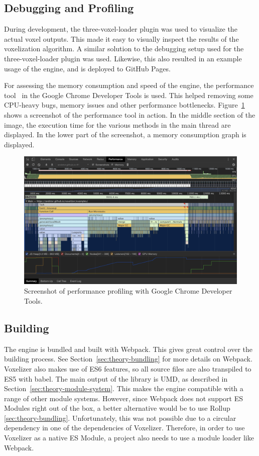 \subsection{Debugging and Profiling}
During development, the three-voxel-loader plugin was used to visualize the actual voxel outputs. This made it easy to visually inspect the results of the voxelization algorithm. A similar solution to the debugging setup used for the three-voxel-loader plugin was used. Likewise, this also resulted in an example usage of the engine, and is deployed to GitHub Pages.

For assessing the memory consumption and speed of the engine, the performance tool~\cite{chrome-dev-tools-profiler} in the Google Chrome Developer Tools is used. This helped removing some CPU-heavy bugs, memory issues and other performance bottlenecks. Figure~\ref{fig:chrome-devtools-performance} shows a screenshot of the performance tool in action. In the middle section of the image, the execution time for the various methods in the main thread are displayed. In the lower part of the screenshot, a memory consumption graph is displayed.
\begin{figure}[ht]
    \centering
    \includegraphics[width=\textwidth]{sections/methodology/figures/chrome-dev-tools-performance.png}
    \caption{Screenshot of performance profiling with Google Chrome Developer Tools.}
    \label{fig:chrome-devtools-performance}
\end{figure}

\subsection{Building}
The engine is bundled and built with Webpack. This gives great control over the building process. See Section~\ref{sec:theory-bundling} for more details on Webpack. Voxelizer also makes use of ES6 features, so all source files are also transpiled to ES5 with babel. The main output of the library is UMD, as described in Section~\ref{sec:theory-module-system}. This makes the engine compatible with a range of other module systems. However, since Webpack does not support ES Modules right out of the box, a better alternative would be to use Rollup \ref{sec:theory-bundling}. Unfortunately, this was not possible due to a circular dependency in one of the dependencies of Voxelizer. Therefore, in order to use Voxelizer as a native ES Module, a project also needs to use a module loader like Webpack.

